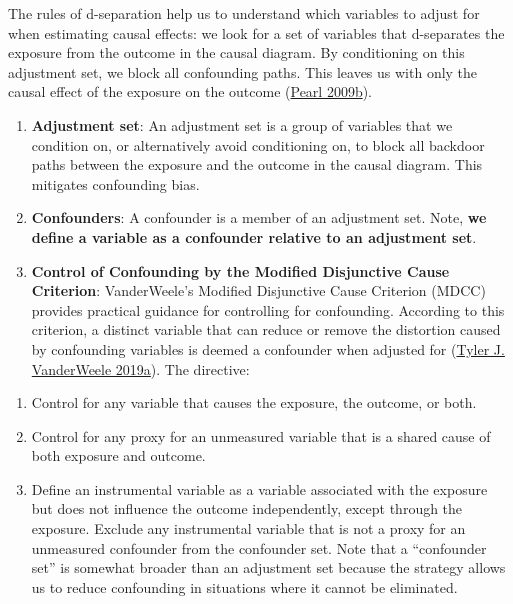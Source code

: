 \documentclass[
  singlecolumn]{report}
\providecommand{\tightlist}{%
  \setlength{\itemsep}{0pt}\setlength{\parskip}{0pt}}\usepackage{longtable,booktabs,array}
\begin{document}
The rules of d-separation help us to understand which variables to
adjust for when estimating causal effects: we look for a set of
variables that d-separates the exposure from the outcome in the causal
diagram. By conditioning on this adjustment set, we block all
confounding paths. This leaves us with only the causal effect of the
exposure on the outcome (\protect\hyperlink{ref-pearl2009a}{Pearl
2009b}).

\begin{enumerate}
\def\labelenumi{\arabic{enumi}.}
\setcounter{enumi}{4}
\item
  \textbf{Adjustment set}: An adjustment set is a group of variables
  that we condition on, or alternatively avoid conditioning on, to block
  all backdoor paths between the exposure and the outcome in the causal
  diagram. This mitigates confounding bias.
\item
  \textbf{Confounders}: A confounder is a member of an adjustment set.
  Note, \textbf{we define a variable as a confounder relative to an
  adjustment set}.
\item
  \textbf{Control of Confounding by the Modified Disjunctive Cause
  Criterion}: VanderWeele's Modified Disjunctive Cause Criterion (MDCC)
  provides practical guidance for controlling for confounding. According
  to this criterion, a distinct variable that can reduce or remove the
  distortion caused by confounding variables is deemed a confounder when
  adjusted for (\protect\hyperlink{ref-vanderweele2019}{Tyler J.
  VanderWeele 2019a}). The directive:
\end{enumerate}

\begin{enumerate}
\def\labelenumi{\alph{enumi}.}
\tightlist
\item
  Control for any variable that causes the exposure, the outcome, or
  both.
\item
  Control for any proxy for an unmeasured variable that is a shared
  cause of both exposure and outcome.
\item
  Define an instrumental variable as a variable associated with the
  exposure but does not influence the outcome independently, except
  through the exposure. Exclude any instrumental variable that is not a
  proxy for an unmeasured confounder from the confounder set. Note that
  a ``confounder set'' is somewhat broader than an adjustment set
  because the strategy allows us to reduce confounding in situations
  where it cannot be eliminated.
\end{enumerate}
\end{document}
